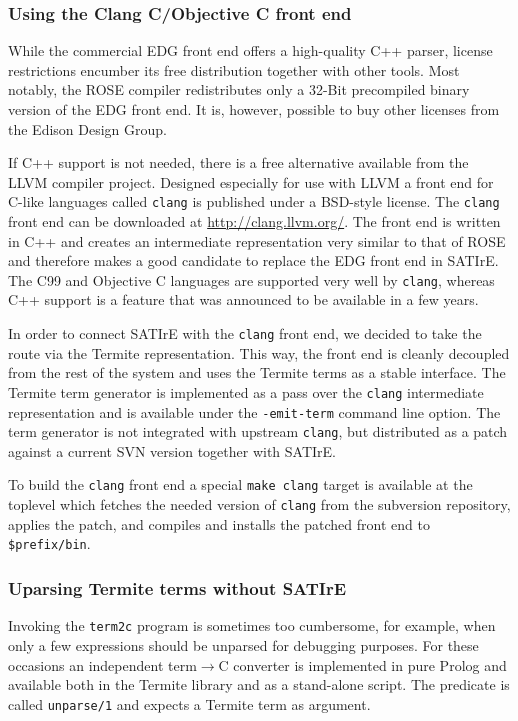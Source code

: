 \documentclass[10pt,twoside]{scrreprt}
\begin{document}
\subsubsection{Using the Clang C/Objective C front end}
While the commercial EDG front end offers a high-quality C++ parser,
license restrictions encumber its free distribution together with
other tools. Most notably, the ROSE compiler redistributes only a
32-Bit precompiled binary version of the EDG front end. It is,
however, possible to buy other licenses from the Edison Design Group.

If C++ support is not needed, there is a free alternative available
from the LLVM compiler project. Designed especially for use with LLVM
a front end for C-like languages called \texttt{clang} is published
under a BSD-style license. The \texttt{clang} front end can be
downloaded at \url{http://clang.llvm.org/}. The front end is written
in C++ and creates an intermediate representation very similar to that
of ROSE and therefore makes a good candidate to replace the
EDG front end in SATIrE. The C99 and Objective C languages are
supported very well by \texttt{clang}, whereas C++ support is a
feature that was announced to be available in a few years.

In order to connect SATIrE with the \texttt{clang} front end, we
decided to take the route via the Termite representation. This way,
the front end is cleanly decoupled from the rest of the system and
uses the Termite terms as a stable interface. The Termite term
generator is implemented as a pass over the \texttt{clang}
intermediate representation and is available under the
\verb|-emit-term| command line option. The term generator is not
integrated with upstream \texttt{clang}, but distributed as a patch
against a current SVN version together with SATIrE. 

To build the \texttt{clang} front end a special \verb|make clang|
target is available at the toplevel which fetches the needed version
of \texttt{clang} from the subversion repository, applies the patch,
and compiles and installs the patched front end to \verb|$prefix/bin|.

\subsubsection{Uparsing Termite terms without SATIrE}
Invoking the \texttt{term2c} program is sometimes too cumbersome, for
example, when only a few expressions should be unparsed for debugging
purposes. For these occasions an independent term$\rightarrow$C
converter is implemented in pure Prolog and available both in the
Termite library and as a stand-alone script. The predicate is called
\verb|unparse/1| and expects a Termite term as argument.
\end{document}
